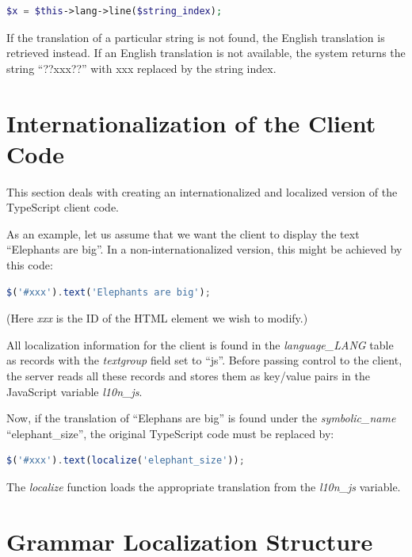 \documentclass[11pt,oneside,a4paper]{memoir}
\begin{document}
\begin{lstlisting}[language=PHP]
$x = $this->lang->line($string_index);
\end{lstlisting}

If the translation of a particular string is not found, the English translation is retrieved
instead. If an English translation is not available, the system returns the string ``??xxx??'' with
xxx replaced by the string index.




\section{Internationalization of the Client Code}\label{sec-localize-javascript}

This section deals with creating an internationalized and localized version of the TypeScript client
code.

As an example, let us assume that we want the client to display the text ``Elephants are big''. In a
non-internationalized version, this might be achieved by this code:

\begin{lstlisting}[language=TypeScript]
$('#xxx').text('Elephants are big');
\end{lstlisting}

(Here \emph{xxx} is the ID of the HTML element we wish to modify.)

All localization information for the client is found in the \emph{language\_LANG} table as records
with the \emph{textgroup} field set to ``js''. Before passing control to the client, the server
reads all these records and stores them as key/value pairs in the JavaScript variable
\emph{l10n\_js}.

Now, if the translation of ``Elephans are big'' is found under the \emph{symbolic\_name}
``elephant\_size'', the original TypeScript code must be replaced by:

\begin{lstlisting}[language=TypeScript]
$('#xxx').text(localize('elephant_size'));
\end{lstlisting}

The \emph{localize} function loads the appropriate translation from the \emph{l10n\_js} variable.


\section{Grammar Localization Structure}\label{sec-gram-loc-struct}
\end{document}
